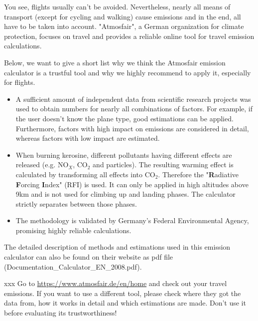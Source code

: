 You see, flights usually can't be avoided. Nevertheless, nearly all means of transport (except for cycling and walking) cause emissions and in the end, all have to be taken into account. 
"Atmosfair", a German organization for climate protection, focuses on travel and provides a reliable online tool for travel emission calculations.


Below, we want to give a short list why we think the Atmosfair emission calculator is a trustful tool and why we highly recommend to apply it, especially for flights. 

\begin{itemize}
	\item A sufficient amount of independent data from scientific research projects was used to obtain numbers for nearly all combinations of factors. For example, if the user doesn't know the plane type, good estimations can be applied. Furthermore, factors with high impact on emissions are considered in detail, whereas factors with low impact are estimated.
	
	\item When burning kerosine, different pollutants having different effects are released (e.g. NO$_X$, CO$_2$ and particles). The resulting warming effect is calculated by transforming all effects into CO$_2$. Therefore the "\textbf{R}adiative \textbf{F}orcing \textbf{I}ndex" (RFI) is used. It can only be applied in high altitudes above 9km and is not used for climbing up and landing phases. The calculator strictly separates between those phases.
	
	\item The methodology is validated by Germany's Federal Environmental Agency, promising highly reliable calculations.
\end{itemize}

The detailed description of methods and estimations used in this emission calculator can also be found on their website as pdf file (Documentation\_Calculator\_EN\_2008.pdf). \cite{flight_calc}%

\begin{suggest} {xxx} %
	Go to \url{https://www.atmosfair.de/en/home} and check out your travel emissions. If you want to use a different tool, please check where they got the data from, how it works in detail and which estimations are made. Don't use it before evaluating its trustworthiness!
\end{suggest}

